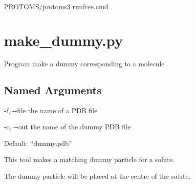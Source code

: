 \documentclass[letterpaper,10pt,english]{sphinxmanual}
\begin{document}
%
\begin{sphinxVerbatim}[commandchars=\\\{\}]
\PYGZdl{}PROTOMS/protoms3 run\PYGZus{}free.cmd
\end{sphinxVerbatim}


\section{make\_dummy.py}
\label{\detokenize{tools:make-dummy-py}}

Program make a dummy corresponding to a molecule


%
\begin{sphinxVerbatim}[commandchars=\\\{\}]
  \PYG{p}{[}\PYG{p}{]} \PYG{p}{[} \PYG{p}{]} \PYG{p}{[} \PYG{p}{]}
\end{sphinxVerbatim}


\subsection{Named Arguments}
\label{\detokenize{tools:Named Arguments}}\begin{optionlist}{3cm}
\item [-f, -{-}file]  
the name of a PDB file
\item [-o, -{-}out]  
the name of the dummy PDB file

Default: “dummy.pdb”
\end{optionlist}


%
\begin{sphinxVerbatim}[commandchars=\\\{\}]
  
    
\end{sphinxVerbatim}


This tool makes a matching dummy particle for a solute.

The dummy particle will be placed at the centre of the solute.
\end{document}
